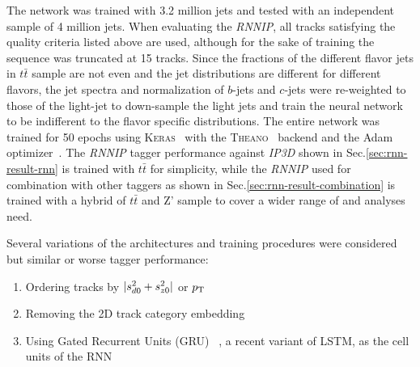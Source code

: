 The network was trained with 3.2 million jets and tested with an independent sample of 4 million jets. When evaluating the \textit{RNNIP}, all tracks satisfying the quality criteria listed above are used, although for the sake of training the sequence was truncated at 15 tracks. Since the fractions of the different flavor jets in $t\bar t$ sample are not even and the jet \pt distributions are different for different flavors, the jet \pt spectra and normalization of $b$-jets and $c$-jets were re-weighted to those of the light-jet to down-sample the light jets and train the neural network to be indifferent to the flavor specific \pt distributions. The entire network was trained for 50 epochs using \textsc{Keras}~\cite{keras} with the \textsc{Theano}~\cite{theano} backend and the Adam optimizer~\cite{ref:ADAM}. The \textit{RNNIP} tagger performance against \textit{IP3D} shown in Sec.\ref{sec:rnn-result-rnn} is trained with $t\bar{t}$ for simplicity, while the \textit{RNNIP} used for combination with other taggers as shown in Sec.\ref{sec:rnn-result-combination} is trained with a hybrid of $t\bar{t}$ and Z' sample to cover a wider range of \pt and analyses need.

Several variations of the architectures and training procedures were considered but similar or worse tagger performance:
\begin{enumerate}
\item Ordering tracks by $|s_{d0}^2 + s_{z0}^2|$ or $p_{{\rm T}}$
\item Removing the 2D track category embedding
\item Using Gated Recurrent Units (GRU) ~\cite{ref:GRU,cho14}, a recent variant of LSTM, as the cell units of the RNN
 
\end{enumerate}

